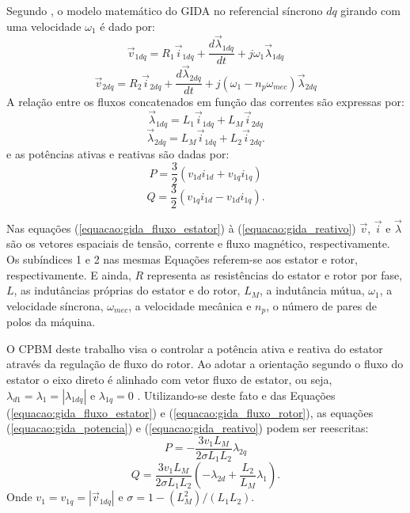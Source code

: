 	Segundo , o modelo matemático do GIDA no referencial síncrono $dq$ girando com uma velocidade $\omega_1$ é dado por: 
	\begin{equation} 
		\label{equacao:gida_ref_sinc_estator}
		\vec{v}_{1dq}=R_1\vec{i}_{1dq}+\frac{d\vec{\lambda}_{1dq}}{dt}+j\omega_1\vec{\lambda}_{1dq}
	\end{equation}
	\begin{equation}
		\label{equacao_gida_ref_sinc_rotor}
		\vec{v}_{2dq}=R_2\vec{i}_{2dq}+\frac{d\vec{\lambda}_{2dq}}{dt}+j(\omega_1-n_p{\omega_{mec}})\vec{\lambda}_{2dq}
	\end{equation}
	A relação entre os fluxos concatenados em função das correntes são expressas por:
	\begin{equation}
		\label{equacao:gida_fluxo_estator}
		\vec{\lambda}_{1dq}=L_1\vec{i}_{1dq}+L_M\vec{i}_{2dq}
	\end{equation}
	\begin{equation}
		\label{equacao:gida_fluxo_rotor}
		\vec{\lambda}_{2dq}=L_M\vec{i}_{1dq}+L_2\vec{i}_{2dq}.
	\end{equation}
	e as potências ativas e reativas são dadas por:
	\begin{equation}
		\label{equacao:gida_potencia}
		P=\frac{3}{2}(v_{1d}i_{1d}+v_{1q}i_{1q})
	\end{equation}
	\begin{equation}
		\label{equacao:gida_reativo}
		Q=\frac{3}{2}(v_{1q}i_{1d}-v_{1d}i_{1q}).
	\end{equation}
	
	Nas equações (\ref{equacao:gida_fluxo_estator}) à (\ref{equacao:gida_reativo}) $\vec{v}$, $\vec{i}$ e $\vec{\lambda}$ são os vetores espaciais de tensão, corrente e fluxo magnético, respectivamente. Os subíndices 1 e 2 nas mesmas Equações referem-se aos estator e rotor, respectivamente. E ainda, $R$ representa as resistências do estator e rotor por fase, $L$, as indutâncias próprias do estator e do rotor, $L_M$, a indutância mútua, $\omega_1$, a velocidade síncrona, $\omega_{mec}$, a velocidade mecânica e $n_p$, o número de pares de polos da máquina.
	
	O CPBM deste trabalho visa o controlar a potência ativa e reativa do estator através da regulação de fluxo do rotor. Ao adotar a orientação segundo o fluxo do estator o eixo direto é alinhado com vetor fluxo de estator, ou seja, $\lambda_{d1}=\lambda_1=|\lambda_{1dq}|$ e $\lambda_{1q}=0$ \cite{paperalfeu}. Utilizando-se deste fato e das Equações (\ref{equacao:gida_fluxo_estator}) e (\ref{equacao:gida_fluxo_rotor}), as equações (\ref{equacao:gida_potencia}) e (\ref{equacao:gida_reativo}) podem ser reescritas:
	\begin{equation}
		\label{equacao:gida_potencia_desacoplamento}
		P=-\frac{3v_1L_M}{2\sigma L_1L_2}\lambda_{2q}
	\end{equation}
	\begin{equation}
		\label{equacao:gida_reativo_desacoplamento}
		Q=\frac{3v_1L_M}{2\sigma L_1L_2}(-\lambda_{2d}+\frac{L_2}{L_M}\lambda_1).
	\end{equation}
	Onde  $v_1=v_{1q}=|\vec{v}_{1dq}|$ e $\sigma=1-(L_M^2)/(L_1L_2)$.
	
